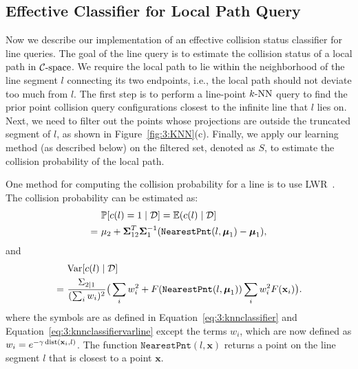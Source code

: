 \subsection{Effective Classifier for Local Path Query}
\label{subsec:3:knnreasoning:pathclassifier}
Now we describe our implementation of an effective collision status classifier for line queries. The goal of the line query is to estimate the collision status of a local path in $\mathcal C\text{-space}$. We require the local path to lie within the neighborhood of the line segment $l$ connecting its two endpoints, i.e., the local path should not deviate too much from $l$. The first step is to perform a line-point $k\text{-NN}$ query to find the prior point collision query configurations closest to the infinite line that $l$ lies on. Next, we need to filter out the points whose projections are outside the truncated segment of $l$, as shown in Figure~\ref{fig:3:KNN}(c). Finally, we apply our learning method (as described below) on the filtered set, denoted as $S$, to estimate the collision probability of the local path.

One method for computing the collision probability for a line is to use LWR~\cite{Burns:2005:ICRA}. The collision probability can be estimated as:
\begin{align}
  \label{eq:3:knnclassifierline}
& \ \mathbb P[c(l) = 1 \mid \mathcal D] = \mathbb E(c(l) \mid \mathcal D] \\ \notag
=& \ \mu_2 + \boldsymbol \Sigma_{12}^T  \boldsymbol\Sigma_1^{-1} (\texttt{NearestPnt}(l, \boldsymbol \mu_1) - \boldsymbol \mu_1),
\end{align}
and
\begin{align}
\label{eq:3:knnclassifiervarline}
& \ \textrm{Var}[c(l) \mid \mathcal D] \\ \notag
=& \ \frac{\Sigma_{2|1}}{(\sum_i w_i)^2} \big( \sum_i w_i^2 + F(\texttt{NearestPnt}(l, \boldsymbol \mu_1)) \sum_i w_i^2 F(\mathbf x_i) \big).
\end{align}
where the symbols are as defined in Equation~\ref{eq:3:knnclassifier} and Equation~\ref{eq:3:knnclassifiervarline} except the terms $w_i$, which are now defined as $w_i = e^{-\gamma \operatorname{dist}(\mathbf x_i, l)}$. The function $\texttt{NearestPnt}(l, \mathbf x)$ returns a point on the line segment $l$ that is closest to a point $\mathbf x$.

